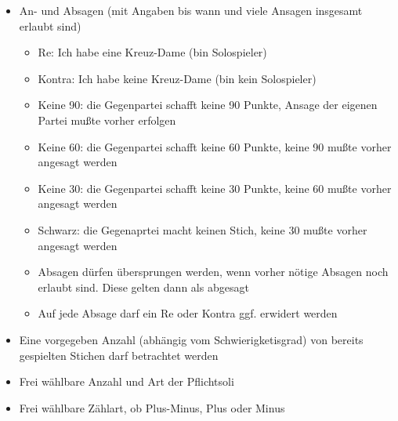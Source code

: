 \documentclass[12pt,a4paper]{article}
\begin{document}
\begin{itemize}
\begin{itemize}
\end{itemize}
\item An- und Absagen (mit Angaben bis wann und viele Ansagen insgesamt erlaubt sind)
\begin{itemize}
\item Re: Ich habe eine Kreuz-Dame (bin Solospieler)
\item Kontra: Ich habe keine Kreuz-Dame (bin kein Solospieler)
\item Keine 90: die Gegenpartei schafft keine 90 Punkte, Ansage der eigenen Partei mußte vorher erfolgen
\item Keine 60: die Gegenpartei schafft keine 60 Punkte, keine 90 mußte vorher angesagt werden
\item Keine 30: die Gegenpartei schafft keine 30 Punkte, keine 60 mußte vorher angesagt werden
\item Schwarz: die Gegenaprtei macht keinen Stich, keine 30 mußte vorher angesagt werden
\item Absagen dürfen übersprungen werden, wenn vorher nötige Absagen noch erlaubt sind. Diese gelten
dann als abgesagt
\item Auf jede Absage darf ein Re oder Kontra ggf. erwidert werden
\end{itemize}
\item Eine vorgegeben Anzahl (abhängig vom Schwierigketisgrad) von bereits gespielten Stichen
darf betrachtet werden
\item Frei wählbare Anzahl und Art der Pflichtsoli
\item Frei wählbare Zählart, ob Plus-Minus, Plus oder Minus
\end{itemize}
\end{document}
